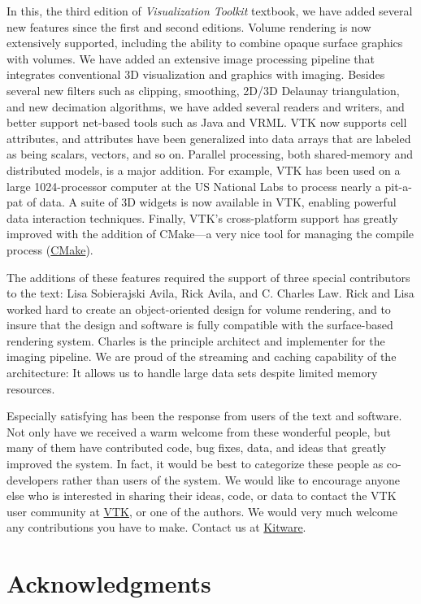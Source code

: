 In this, the third edition of \textit{Visualization Toolkit} textbook, we have added several new features since the first and second editions. Volume rendering is now extensively supported, including the ability to combine opaque surface graphics with volumes. We have added an extensive image processing pipeline that integrates conventional 3D visualization and graphics with imaging. Besides several new filters such as clipping, smoothing, 2D/3D Delaunay triangulation, and new decimation algorithms, we have added several readers and writers, and better support net-based tools such as Java and VRML. VTK now supports cell attributes, and attributes have been generalized into data arrays that are labeled as being scalars, vectors, and so on. Parallel processing, both shared-memory and distributed models, is a major addition. For example, VTK has been used on a large 1024-processor computer at the US National Labs to process nearly a pit-a-pat of data. A suite of 3D widgets is now available in VTK, enabling powerful data interaction techniques. Finally, VTK's cross-platform support has greatly improved with the addition of CMake---a very nice tool for managing the compile process (\href{https://www.cmake.org}{CMake}).

The additions of these features required the support of three special contributors to the text: Lisa Sobierajski Avila, Rick Avila, and C. Charles Law. Rick and Lisa worked hard to create an object-oriented design for volume rendering, and to insure that the design and software is fully compatible with the surface-based rendering system. Charles is the principle architect and implementer for the imaging pipeline. We are proud of the streaming and caching capability of the architecture: It allows us to handle large data sets despite limited memory resources.

Especially satisfying has been the response from users of the text and software. Not only have we received a warm welcome from these wonderful people, but many of them have contributed code, bug fixes, data, and ideas that greatly improved the system. In fact, it would be best to categorize these people as co-developers rather than users of the system. We would like to encourage anyone else who is interested in sharing their ideas, code, or data to contact the VTK user community at \href{https://www.vtk.org/}{VTK}, or one of the authors. We would very much welcome any contributions you have to make. Contact us at \href{https://www.kitware.com/}{Kitware}.

\chapter*{Acknowledgments}
\markright{}


